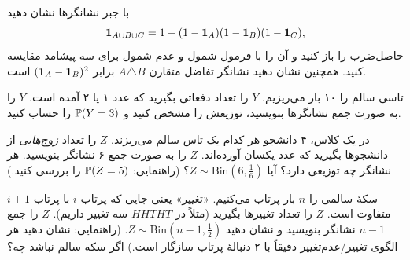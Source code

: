 \begin{exercise}
با جبر نشانگرها نشان دهید
\[ \ind_{A\cup B\cup C}=1-(1-\ind_A)(1-\ind_B)(1-\ind_C), \]
حاصل‌ضرب را باز کنید و آن را با فرمول شمول و عدم شمول برای سه پیشامد مقایسه کنید. همچنین نشان دهید نشانگر تفاضل متقارن $A\triangle B$ برابر $(\ind_A-\ind_B)^2$ است.
\end{exercise}

\begin{exercise}
تاسی سالم را ۱۰ بار می‌ریزیم. $Y$ را تعداد دفعاتی بگیرید که عدد ۱ یا ۲ آمده است. $Y$ را به صورت جمع نشانگرها بنویسید، توزیعش را مشخص کنید و $\P(Y=3)$ را حساب کنید.
\end{exercise}

\begin{exercise}
در یک کلاس، ۴ دانشجو هر کدام یک تاس سالم می‌ریزند. $Z$ را تعداد \emph{زوج‌هایی} از دانشجوها بگیرید که عدد یکسان آورده‌اند. $Z$ را به صورت جمع ۶ نشانگر بنویسید. هر نشانگر چه توزیعی دارد؟ آیا $Z\sim\mathrm{Bin}(6,\tfrac16)$؟ (راهنمایی: $\P(Z=5)$ را بررسی کنید.)
\end{exercise}

\begin{exercise}\hard
سکهٔ سالمی را $n$ بار پرتاب می‌کنیم. «تغییر» یعنی جایی که پرتاب $i$ با پرتاب $i+1$ متفاوت است. $Z$ را تعداد تغییرها بگیرید (مثلاً در $HHTHT$ سه تغییر داریم). $Z$ را جمع $n-1$ نشانگر بنویسید و نشان دهید $Z\sim\mathrm{Bin}(n-1,\tfrac12)$. (راهنمایی: نشان دهید هر الگوی تغییر/عدم‌تغییر دقیقاً با ۲ دنبالهٔ پرتاب سازگار است.) اگر سکه سالم نباشد چه؟
\end{exercise}
